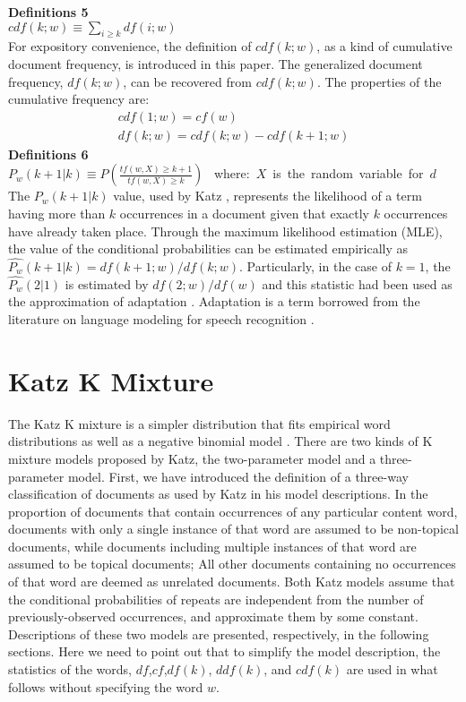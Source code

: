 \documentclass[english]{jnlp_1.4_rep}
\begin{document}
\textbf{Definitions 5} \\
  $\mathit{cdf}(k;w)\equiv \sum\limits_{i \ge k}\mathit{df}(i;w)$ \\
  For expository convenience, the definition of $\mathit{cdf}(k;w)$, as a kind of cumulative document 
\linebreak
frequency, is introduced in this paper. The
  generalized document frequency, $\mathit{df}(k;w)$, can be recovered from $\mathit{cdf}(k;w)$. The properties of the cumulative frequency are:
\begin{gather*}
  \mathit{cdf}(1;w)=\mathit{cf}(w)  \\
  \mathit{df}(k;w)= \mathit{cdf}(k;w)-\mathit{cdf}(k+1;w) 
\end{gather*}
\textbf{Definitions 6} \\
  $P_{w}(k+1|k) \equiv P(\frac{\mathit{tf}(w,X) \ge k+1}{\mathit{tf}(w,X) \ge k})$
  \mbox{ where: $X$ is the random variable for $d$} \\
  The $P_{w}(k+1|k)$ value, used by Katz \cite{Katz96}, represents the likelihood of a term having more than $k$ occurrences in a document given that
exactly $k$ occurrences have already taken place. Through the maximum likelihood estimation (MLE), the value of the conditional probabilities can be
estimated empirically as $\hat{P_{w}}(k+1|k)=\mathit{df}(k+1;w) / \mathit{df}(k;w)$. Particularly, in the case of $k=1$, the $\hat{P_{w}}(2|1)$ is
estimated by $\mathit{df}(2;w) / \mathit{df}(w)$ and this statistic had been used as the approximation of adaptation \cite{Church2000}. Adaptation
is a term borrowed from the literature on language modeling for speech recognition \cite{Jelinek99}.


\section{Katz K Mixture}

The Katz K mixture is a simpler distribution that fits empirical word distributions as well as a negative binomial model \cite{Manning99}. There are
two kinds of K mixture models proposed by Katz, the two-parameter model and a three-parameter model. First, we have introduced the definition of a
three-way classification of documents \cite{Bookstein74} as used by Katz in his model descriptions. In the proportion of documents that contain
occurrences of any particular content word, documents with only a single instance of that word are assumed to be non-topical documents, while
documents including multiple instances of that word are assumed to be topical documents; All other documents containing no occurrences of that word
are deemed as unrelated documents. Both Katz models assume that the conditional probabilities of repeats are independent from the number of
previously-observed occurrences, and approximate them by some constant. Descriptions of these two models are presented, respectively, in the
following sections. Here we need to point out that to simplify the model description, the statistics of the words,
$\mathit{df}$,$\mathit{cf}$,$\mathit{df}(k)$, $\mathit{ddf}(k)$, and $\mathit{cdf}(k)$ are used in what follows without specifying the word $w$.
\end{document}

